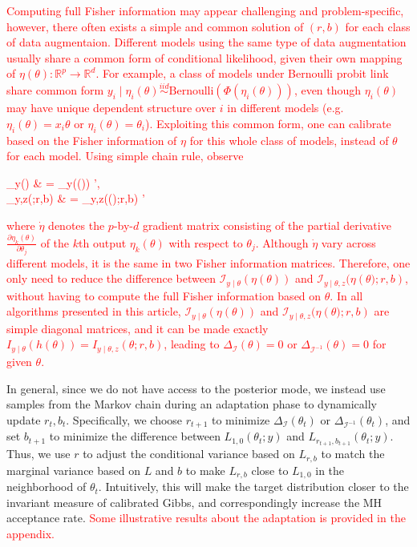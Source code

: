 \documentclass[11pt]{article}
\newcommand{\leo}[1]{{\textcolor{red}{#1}}}
\newcommand{\be}{\begin{equs}}
\newcommand{\ee}{\end{equs}}
\newcommand{\bb}[1]{\mathbb{#1}}
\newcommand{\mc}[1]{\mathcal{#1}}
\newcommand{\Bern}{\text{Bernoulli}}
\begin{document}
\leo{
Computing full Fisher information may appear challenging  and problem-specific,
however,  there often exists a simple and common solution of $(r,b)$ for each class of data
augmentaion. Different models using the same type of data augmentation  usually share
a common form of conditional likelihood, given their own mapping of  $\eta(\theta):\bb
R^p\rightarrow \bb R^d $. For example, a class of
models under Bernoulli  probit link share common form $y_{i}\mid \eta_{i}(\theta) \stackrel{iid}{\sim}
\Bern( \Phi(\eta_{i}(\theta)) )$, even though $\eta_{i}(\theta)$ may have
unique dependent structure over $i$ in different models (e.g. $\eta_{i}(\theta)=x_{i}\theta$ or $\eta_i(\theta)=\theta_i$). Exploiting this common form, one can calibrate
based on the Fisher information of $\eta$ for this whole class of models, instead of $\theta$ for each model. Using  simple chain rule, observe
 \be\mc I_{y\mid \theta}({\theta})  &  =  \dot \eta\mc I_{y\mid \theta}(\eta({\theta}))  \dot \eta', \\
  \mc I_{y\mid \theta,z}({\theta};r,b) & = \dot \eta\mc I_{y\mid \theta,z}(\eta({\theta)};r,b)  \dot \eta'
\ee
where $\dot \eta$ denotes the $p$-by-$d$ gradient matrix consisting of the partial
derivative $\frac{\partial
\eta_{k}(\theta)}{\partial \theta_j}$ of  the $k$th output 
$\eta_{k}(\theta)$ with respect to $\theta_j$. Although $ \dot \eta$ vary
across different models, it is the same in
two Fisher information matrices. Therefore, one only need to reduce
the difference between  $\mc I_{y\mid \theta}(\eta({\theta}))$  and $\mc I_{y\mid \theta,z}(\eta({\theta)};r,b)$, without having to compute the full
Fisher information based on $\theta$. In all algorithms presented in
this article,  $\mc I_{y\mid \theta}(\eta({\theta}))$  and $\mc I_{y\mid \theta,z}(\eta({\theta)};r,b)$ are simple diagonal matrices, and 
 it can be made exactly $I_{y\mid \theta}(h({\theta}))=I_{y\mid \theta,z}({\theta};r,b)$, leading to $\Delta_{\mc I}(\theta)=0$ or $\Delta_{\mc I^{-1}}(\theta)=0$ for given $\theta$.
 }  

In general, since we do not have access to the posterior mode, we instead use samples from the Markov chain during an adaptation phase to dynamically update $r_t,b_t$. Specifically, we choose $r_{t+1}$ to minimize $\Delta_{\mc I}(\theta_t)$ or $\Delta_{\mc I^{-1}}(\theta_t)$, and set $b_{t+1}$ to minimize the difference between $L_{1,0}(\theta_t;y)$ and $L_{r_{t+1},b_{t+1}}(\theta_t;y)$. Thus, we use $r$ to adjust the conditional variance based on $L_{r,b}$ to match the marginal variance based on $L$ and $b$ to make $L_{r,b}$ close to $L_{1,0}$ in the neighborhood of $\theta_t$. Intuitively, this will make the target distribution closer to the invariant measure of calibrated Gibbs, and correspondingly increase the MH acceptance rate. \leo{Some illustrative results about the adaptation
is provided in the appendix.} 
\end{document}
